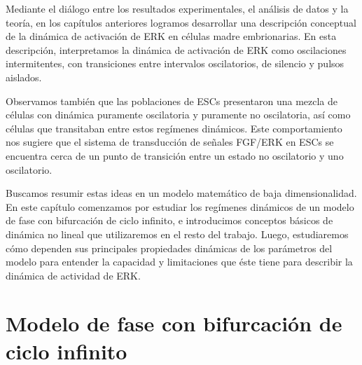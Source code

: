 \documentclass[./main.tex]{subfiles}
\begin{document}
Mediante el diálogo entre los resultados experimentales, el análisis de datos y la teoría, en los capítulos anteriores logramos desarrollar una descripción conceptual de la dinámica de activación de ERK en células madre embrionarias. En esta descripción, interpretamos la dinámica de activación de ERK como oscilaciones intermitentes, con transiciones entre intervalos oscilatorios, de silencio y pulsos aislados. 



Observamos también que las poblaciones de ESCs presentaron una mezcla de células con dinámica puramente oscilatoria y puramente no oscilatoria, así como células que transitaban entre estos regímenes dinámicos. Este comportamiento nos sugiere que el sistema de transducción de señales FGF/ERK en ESCs se encuentra cerca de un punto de transición entre un estado no oscilatorio y uno oscilatorio. %




Buscamos resumir estas ideas en un modelo matemático de baja dimensionalidad. En este capítulo comenzamos por estudiar los regímenes dinámicos de un modelo de fase con bifurcación de ciclo infinito, e introducimos conceptos básicos de dinámica no lineal que utilizaremos en el resto del trabajo. Luego, estudiaremos cómo dependen sus principales propiedades dinámicas de los parámetros del modelo para entender la capacidad y limitaciones que éste tiene para describir la dinámica de actividad de ERK.


\section{Modelo de fase con bifurcación de ciclo infinito}
\label{C5_sec:osc_exc}
\end{document}

